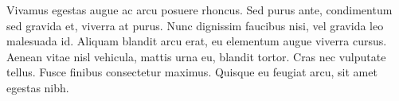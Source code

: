 Vivamus egestas augue ac arcu posuere rhoncus. Sed purus ante, condimentum sed gravida et, viverra at purus. Nunc dignissim faucibus nisi, vel gravida leo malesuada id. Aliquam blandit arcu erat, eu elementum augue viverra cursus. Aenean vitae nisl vehicula, mattis urna eu, blandit tortor. Cras nec vulputate tellus. Fusce finibus consectetur maximus. Quisque eu feugiat arcu, sit amet egestas nibh.

\endmulti

\bye 
